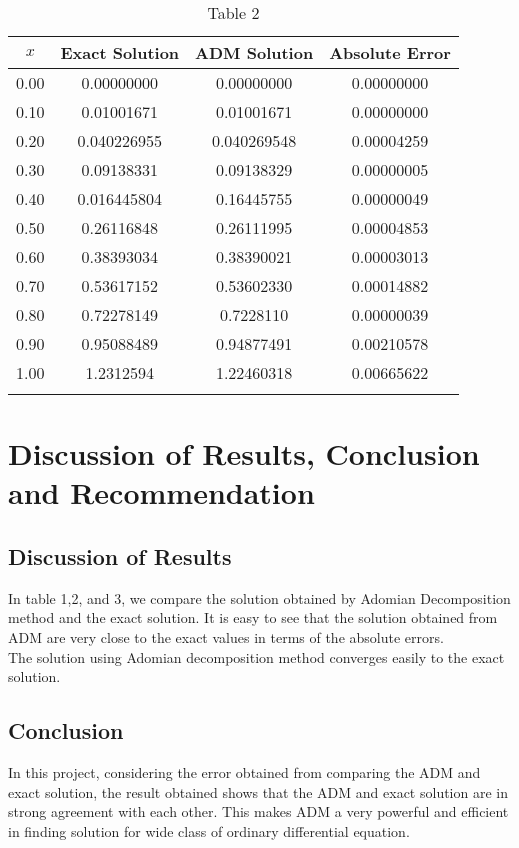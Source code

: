 \documentclass[11pt]{report}
\newcommand{\NI}{\noindent}
\begin{document}
	\begin{longtable}{|c|c|c|c|}
		\hline
		$x$ & Exact Solution & ADM Solution & Absolute Error\\\hline
		0.00 & 0.00000000 & 0.00000000 & 0.00000000\\
		0.10 & 0.01001671 & 0.01001671 & 0.00000000\\
		0.20 & 0.040226955 & 0.040269548 & 0.00004259\\
		0.30 & 0.09138331 & 0.09138329 & 0.00000005\\
		0.40 & 0.016445804 & 0.16445755 & 0.00000049\\
		0.50 & 0.26116848 & 0.26111995 & 0.00004853\\
		0.60 & 0.38393034 & 0.38390021 & 0.00003013\\
		0.70 & 0.53617152 & 0.53602330 & 0.00014882\\
		0.80 & 0.72278149 & 0.7228110 & 0.00000039\\
		0.90 & 0.95088489 & 0.94877491 & 0.00210578\\
		1.00 & 1.2312594 & 1.22460318 & 0.00665622\\\hline
		\caption{Table 2}
	\end{longtable}

	
	\chapter{Discussion of Results, Conclusion and Recommendation}
	\section{Discussion of Results}
	In table 1,2, and 3, we compare the solution obtained by Adomian Decomposition method and the exact solution. It is easy to see that the solution obtained from ADM are very close to the exact values in terms of the absolute errors.\\
	
	\NI The solution using Adomian decomposition method converges easily to the exact solution.
	
	\section{Conclusion}
	In this project, considering the error obtained from comparing the ADM and exact solution, the result obtained shows that the ADM and exact solution are in strong agreement with each other. This makes ADM a very powerful and efficient in finding solution for wide class of ordinary differential equation.
	
\end{document}
